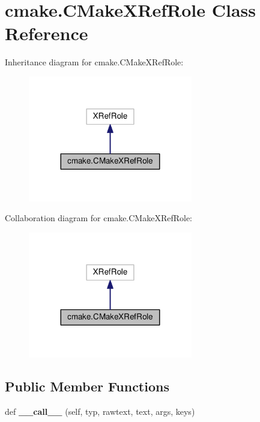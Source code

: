 \hypertarget{classcmake_1_1CMakeXRefRole}{}\section{cmake.\+C\+Make\+X\+Ref\+Role Class Reference}
\label{classcmake_1_1CMakeXRefRole}


Inheritance diagram for cmake.\+C\+Make\+X\+Ref\+Role\+:
\nopagebreak
\begin{figure}[H]
\begin{center}
\leavevmode
\includegraphics[width=203pt]{classcmake_1_1CMakeXRefRole__inherit__graph}
\end{center}
\end{figure}


Collaboration diagram for cmake.\+C\+Make\+X\+Ref\+Role\+:
\nopagebreak
\begin{figure}[H]
\begin{center}
\leavevmode
\includegraphics[width=203pt]{classcmake_1_1CMakeXRefRole__coll__graph}
\end{center}
\end{figure}
\subsection*{Public Member Functions}
\begin{DoxyCompactItemize}
\item 
def {\bfseries \+\_\+\+\_\+call\+\_\+\+\_\+} (self, typ, rawtext, text, args, keys)\hypertarget{classcmake_1_1CMakeXRefRole_ac1902f080ef5f30ca8ab71515d6e0024}{}\label{classcmake_1_1CMakeXRefRole_ac1902f080ef5f30ca8ab71515d6e0024}

\end{DoxyCompactItemize}
